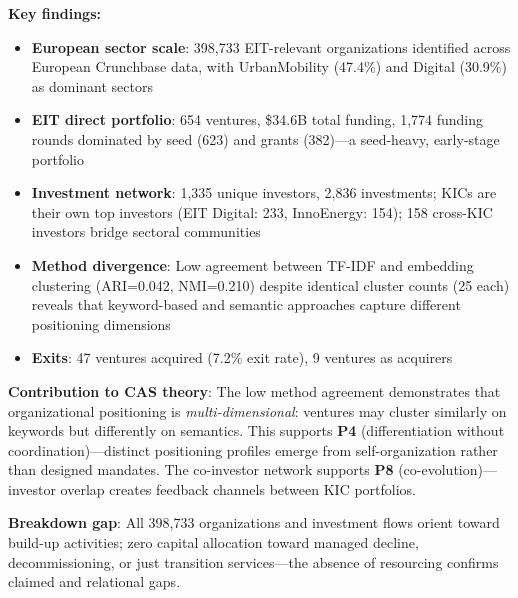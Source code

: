 \documentclass[../main.tex]{subfiles}
\begin{document}
\begin{summarybox}
\textbf{Key findings:}
\begin{itemize}[leftmargin=*, itemsep=0.1em]
\item \textbf{European sector scale}: 398,733 EIT-relevant organizations identified across European Crunchbase data, with UrbanMobility (47.4\%) and Digital (30.9\%) as dominant sectors
\item \textbf{EIT direct portfolio}: 654 ventures, \$34.6B total funding, 1,774 funding rounds dominated by seed (623) and grants (382)---a seed-heavy, early-stage portfolio
\item \textbf{Investment network}: 1,335 unique investors, 2,836 investments; KICs are their own top investors (EIT Digital: 233, InnoEnergy: 154); 158 cross-KIC investors bridge sectoral communities
\item \textbf{Method divergence}: Low agreement between TF-IDF and embedding clustering (ARI=0.042, NMI=0.210) despite identical cluster counts (25 each) reveals that keyword-based and semantic approaches capture different positioning dimensions
\item \textbf{Exits}: 47 ventures acquired (7.2\% exit rate), 9 ventures as acquirers
\end{itemize}

\textbf{Contribution to CAS theory}: The low method agreement demonstrates that organizational positioning is \emph{multi-dimensional}: ventures may cluster similarly on keywords but differently on semantics. This supports \textbf{P4} (differentiation without coordination)---distinct positioning profiles emerge from self-organization rather than designed mandates. The co-investor network supports \textbf{P8} (co-evolution)---investor overlap creates feedback channels between KIC portfolios.

\textbf{Breakdown gap}: All 398,733 organizations and investment flows orient toward build-up activities; zero capital allocation toward managed decline, decommissioning, or just transition services---the absence of resourcing confirms claimed and relational gaps.
\end{summarybox}
\end{document}
